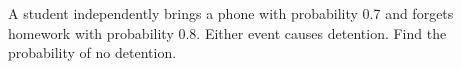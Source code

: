 A student independently brings a phone with probability 0.7 and forgets homework with probability 0.8. Either event causes detention. Find the probability of no detention.
